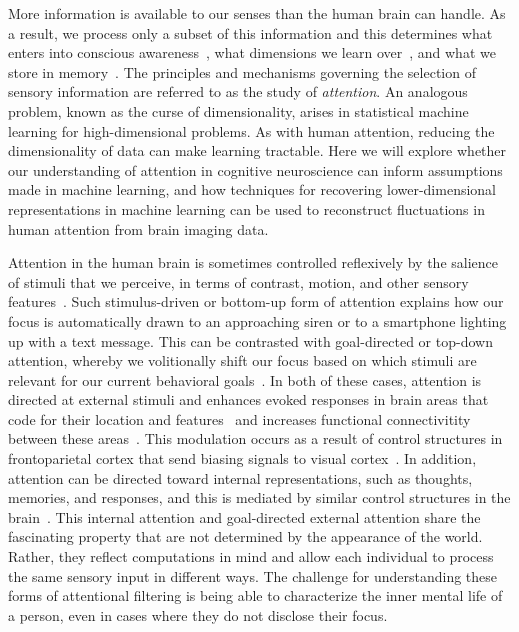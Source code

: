 
\label{sec:aim3}

More information is available to our senses than the human brain can handle. As a result, we process only a subset of this information and this determines what enters into conscious awareness~\citep{Most:2005}, what dimensions we learn over~\citep{Turk-Browne:2005}, and what we store in memory~\citep{Aly:2016}. The principles and mechanisms governing the selection of sensory information are referred to as the study of \textit{attention}. An analogous problem, known as the curse of dimensionality, arises in statistical machine learning for high-dimensional problems. As with human attention, reducing the dimensionality of data can make learning tractable. Here we will explore whether our understanding of attention in cognitive neuroscience can inform assumptions made in machine learning, and how techniques for recovering lower-dimensional representations in machine learning can be used to reconstruct fluctuations in human attention from brain imaging data.

\biobackground{} Attention in the human brain is sometimes controlled
reflexively by the salience of stimuli that we perceive, in terms of
contrast, motion, and other sensory features~\citep{Itti:2000}. Such
stimulus-driven or bottom-up form of attention explains how our focus
is automatically drawn to an approaching siren or to a smartphone
lighting up with a text message. This can be contrasted with
goal-directed or top-down attention, whereby we volitionally shift our
focus based on which stimuli are relevant for our current behavioral
goals~\citep{Yantis:2000}. In both of these cases, attention is
directed at external stimuli and enhances evoked responses in brain
areas that code for their location and features~\citep{Kastner:2000}
and increases functional connectivitity between these
areas~\citep{Turk-Browne:2013}. This modulation occurs as a result of
control structures in frontoparietal cortex that send biasing signals
to visual cortex~\citep{Noudoost:2010}. In addition, attention can be
directed toward internal representations, such as thoughts, memories,
and responses, and this is mediated by similar control structures in
the brain~\citep{Chun:2013}. This internal attention and goal-directed
external attention share the fascinating property that are not
determined by the appearance of the world. Rather, they reflect
computations in mind and allow each individual to process the same
sensory input in different ways. The challenge for understanding these
forms of attentional filtering is being able to characterize the inner
mental life of a person, even in cases where they do not disclose
their focus.

